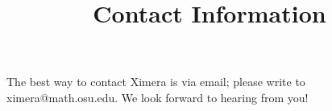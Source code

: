 \documentclass{ximera}
\title{Contact Information}
\begin{document}
The best way to contact Ximera is via email; please write to
ximera@math.osu.edu. We look forward to hearing from you!
\end{document}
